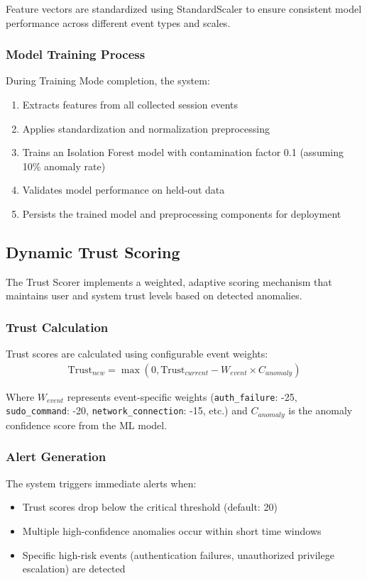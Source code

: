 \documentclass[conference]{IEEEtran}
\begin{document}
Feature vectors are standardized using StandardScaler
to ensure consistent model performance across different event
types and scales.

\subsubsection{Model Training Process}
During Training Mode completion, the system:
\begin{enumerate}
    \item Extracts features from all collected session events
    \item Applies standardization and normalization preprocessing
    \item Trains an Isolation Forest model with contamination factor 0.1 (assuming 10\% anomaly rate)
    \item Validates model performance on held-out data
    \item Persists the trained model and preprocessing components for deployment
\end{enumerate}

\subsection{Dynamic Trust Scoring}
The Trust Scorer implements a weighted, adaptive scoring
mechanism that maintains user and system trust levels based
on detected anomalies.

\subsubsection{Trust Calculation}
Trust scores are calculated using configurable event weights:
\begin{align}
\text{Trust}_{new} = \max(0, \text{Trust}_{current} - W_{event} \times C_{anomaly})
\end{align}

Where $W_{event}$ represents event-specific weights (\texttt{auth\_failure}: -25, \texttt{sudo\_command}: -20, \texttt{network\_connection}: -15, etc.) and $C_{anomaly}$ is the anomaly confidence score from the ML model.

\subsubsection{Alert Generation}
The system triggers immediate alerts when:
\begin{itemize}[leftmargin=*]
  \item Trust scores drop below the critical threshold (default: 20)
  \item Multiple high-confidence anomalies occur within short time windows
  \item Specific high-risk events (authentication failures, unauthorized privilege escalation) are detected
\end{itemize}
\end{document}
